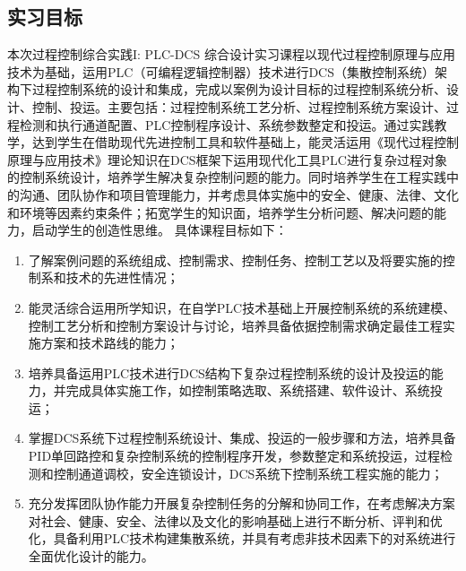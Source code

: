 \documentclass[UTF8]{article}
\begin{document}
\subsection{实习目标}
本次过程控制综合实践I: PLC-DCS 综合设计实习课程以现代过程控制原理与应用技术为基础，运用PLC（可编程逻辑控制器）技术进行DCS（集散控制系统）架构下过程控制系统的设计和集成，完成以案例为设计目标的过程控制系统分析、设计、控制、投运。主要包括：过程控制系统工艺分析、过程控制系统方案设计、过程检测和执行通道配置、PLC控制程序设计、系统参数整定和投运。通过实践教学，达到学生在借助现代先进控制工具和软件基础上，能灵活运用《现代过程控制原理与应用技术》理论知识在DCS框架下运用现代化工具PLC进行复杂过程对象的控制系统设计，培养学生解决复杂控制问题的能力。同时培养学生在工程实践中的沟通、团队协作和项目管理能力，并考虑具体实施中的安全、健康、法律、文化和环境等因素约束条件；拓宽学生的知识面，培养学生分析问题、解决问题的能力，启动学生的创造性思维。
具体课程目标如下：
\begin{enumerate}
	\item 了解案例问题的系统组成、控制需求、控制任务、控制工艺以及将要实施的控制系和技术的先进性情况；
	\item 能灵活综合运用所学知识，在自学PLC技术基础上开展控制系统的系统建模、控制工艺分析和控制方案设计与讨论，培养具备依据控制需求确定最佳工程实施方案和技术路线的能力；
	\item 培养具备运用PLC技术进行DCS结构下复杂过程控制系统的设计及投运的能力，并完成具体实施工作，如控制策略选取、系统搭建、软件设计、系统投运；
	\item 掌握DCS系统下过程控制系统设计、集成、投运的一般步骤和方法，培养具备PID单回路控和复杂控制系统的控制程序开发，参数整定和系统投运，过程检测和控制通道调校，安全连锁设计，DCS系统下控制系统工程实施的能力；
	\item 充分发挥团队协作能力开展复杂控制任务的分解和协同工作，在考虑解决方案对社会、健康、安全、法律以及文化的影响基础上进行不断分析、评判和优化，具备利用PLC技术构建集散系统，并具有考虑非技术因素下的对系统进行全面优化设计的能力。
\end{enumerate}

\end{document}
